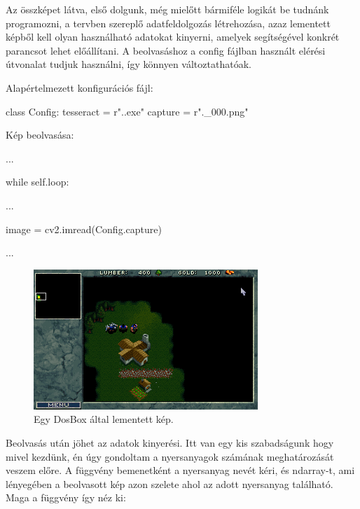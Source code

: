 Az összképet látva, első dolgunk, még mielőtt bármiféle logikát be tudnánk programozni, a tervben szereplő adatfeldolgozás létrehozása, azaz lementett képből kell olyan használható adatokat kinyerni, amelyek segítségével konkrét parancsot lehet előállítani. 
A beolvasáshoz a config fájlban használt elérési útvonalat tudjuk használni, így könnyen változtathatóak.

Alapértelmezett konfigurációs fájl:
\begin{python}
    class Config:
        tesseract = r".\TesseractOCR\tesseract.exe"
        capture = r".\capture\war_000.png"
\end{python}

Kép beolvasása:

\begin{python}
    ...

    while self.loop:

        ... 
        
        image = cv2.imread(Config.capture)

        ...
\end{python}


\begin{figure}[h]
\centering
\includegraphics[scale=1]{images/war_000.png}
\caption{Egy DosBox által lementett kép.}
\label{fig:abra}
\end{figure}

Beolvasás után jöhet az adatok kinyerési. Itt van egy kis szabadságunk hogy mivel kezdünk, én úgy gondoltam a nyersanyagok számának meghatározását veszem előre. A függvény bemenetként a nyersanyag nevét kéri, és ndarray-t, 
ami lényegében a beolvasott kép azon szelete ahol az adott nyersanyag található.
Maga a függvény így néz ki:

